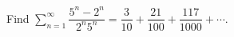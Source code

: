 Find $\displaystyle\sum_{n=1}^{\infty}\dfrac{5^n-2^n}{2^n5^n}=\dfrac3{10}+\dfrac{21}{100}+\dfrac{117}{1000}+\cdots$.
